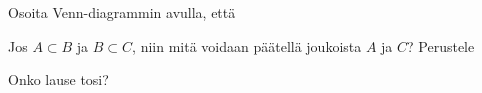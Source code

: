 \begin{kotitehtavasivu}
\begin{tehtava}
    \begin{vastaus}
    
        \begin{alakohdat}
        \end{alakohdat}
    \end{vastaus}
\end{tehtava}


\begin{tehtava}
Osoita Venn-diagrammin avulla, että
    \begin{alakohdat}
        \alakohta{\[
X\setminus (A\cup B) = (X\setminus A)\cap (X\setminus B),
\]}
        \alakohta{\[
X \setminus (A\cap B) = (X\setminus A)\cup (X\setminus B).
\]}
      
    \end{alakohdat}

\end{tehtava}


\begin{tehtava}
Jos $A\subset B$ ja $B\subset C$, niin mitä voidaan päätellä joukoista $A$ ja $C$? Perustele 
    \begin{alakohdat}
    \end{alakohdat}

    \begin{vastaus}
    
        \begin{alakohdat}
        \end{alakohdat}
    \end{vastaus}
\end{tehtava}


\begin{tehtava}
Onko lause tosi?
    \begin{alakohdat}
    \end{alakohdat}

    \begin{vastaus}
    

\end{vastaus}
\end{tehtava}
\end{kotitehtavasivu}
